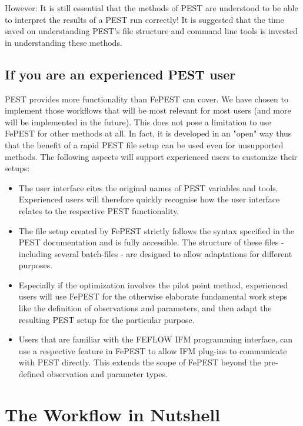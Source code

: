 However: It is still essential that the methods of PEST are understood to be able to interpret the  results of a PEST run correctly! It is suggested that the time saved on understanding PEST's file structure and command line tools is invested in understanding these methods.

\subsection{If you are an experienced PEST user}

PEST provides more functionality than FePEST can cover. We have chosen to implement those workflows that will be most relevant for most users (and more will be implemented in the future). 
This does not pose a limitation to use FePEST for other methods at all. In fact, it is developed in an "open" way thus that the benefit of a rapid PEST file setup can be used even for unsupported methods. The following aspects will support experienced users to customize their setups:

\begin{itemize}

\item The user interface cites the original names of PEST variables and tools. Experienced users will therefore quickly recognise how the user interface relates to the respective PEST functionality.

\item The file setup created by FePEST strictly follows the syntax specified in the PEST documentation and is fully accessible. The structure of these files - including several batch-files - are designed to allow adaptations for different purposes.

\item Especially if the optimization involves the pilot point method, experienced users will use FePEST for the otherwise elaborate fundamental work steps like the definition of observations and parameters, and then adapt the resulting PEST setup for the particular purpose.

\item Users that are familiar with the FEFLOW IFM programming interface, can use a respective feature in FePEST to allow IFM plug-ins to communicate with PEST directly. This extends the scope of FePEST beyond the pre-defined observation and parameter types.
\end{itemize}


\section{The Workflow in Nutshell}

